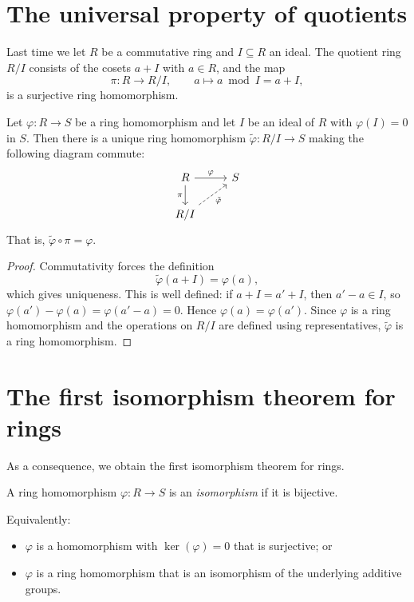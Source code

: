 \documentclass[reqno,11pt]{amsart}
\begin{document}
\raggedbottom
\makelecturetitle

\section{The universal property of quotients}

Last time we let $R$ be a commutative ring and $I\subseteq R$ an
ideal. The quotient ring $R/I$ consists of the cosets $a+I$ with
$a\in R$, and the map
\[
  \pi:R\to R/I,\qquad a\mapsto a\bmod I=a+I,
\]
is a surjective ring homomorphism.

\begin{theorem}\label{thm:universal}
Let $\varphi:R\to S$ be a ring homomorphism and let $I$ be an ideal
of $R$ with $\varphi(I)=0$ in $S$. Then there is a unique ring
homomorphism $\tilde\varphi:R/I\to S$ making the following diagram
commute:
\[
  \begin{tikzcd}
    R \arrow[r,"\varphi"] \arrow[d,"\pi"'] & S\\
    R/I \arrow[ur,dashed,"\tilde\varphi"'] &
  \end{tikzcd}
\]
That is, $\tilde\varphi\circ\pi=\varphi$.
\end{theorem}
\begin{proof}
Commutativity forces the definition
\[
  \tilde\varphi(a+I)=\varphi(a),
\]
which gives uniqueness. This is well defined: if $a+I=a'+I$, then
$a'-a\in I$, so $\varphi(a')-\varphi(a)=\varphi(a'-a)=0$.
Hence $\varphi(a)=\varphi(a')$. Since $\varphi$ is a ring
homomorphism and the operations on $R/I$ are defined using
representatives, $\tilde\varphi$ is a ring homomorphism.
\end{proof}


\section{The first isomorphism theorem for rings}

As a consequence, we obtain the first isomorphism theorem for rings.

\begin{definition}
A ring homomorphism $\varphi:R\to S$ is an \emph{isomorphism} if it
is bijective.
\end{definition}

\begin{remark}
Equivalently:
\begin{itemize}
  \item $\varphi$ is a homomorphism with $\ker(\varphi)=0$ that is
        surjective; or
  \item $\varphi$ is a ring homomorphism that is an isomorphism of
        the underlying additive groups.
\end{itemize}
\end{remark}
\end{document}
